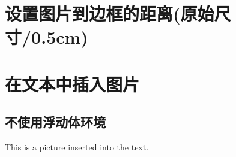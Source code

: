 \documentclass{article}
\begin{document}
\section{设置图片到边框的距离(原始尺寸/0.5cm)}
    \setlength{\fboxsep}{.5cm}

\section{在文本中插入图片}
\subsection{不使用浮动体环境}
    This is a picture  inserted into the text.
\end{document}
